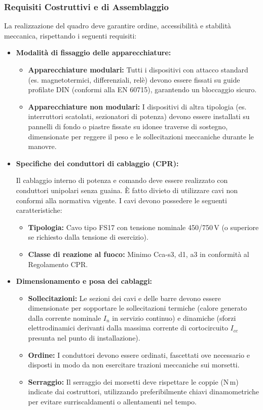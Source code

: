 \subsubsection{Requisiti Costruttivi e di Assemblaggio}
La realizzazione del quadro deve garantire ordine, accessibilità e stabilità meccanica, rispettando i seguenti requisiti:
\begin{itemize}
\item \textbf{Modalità di fissaggio delle apparecchiature:}
\begin{itemize}
\item \textbf{Apparecchiature modulari:} Tutti i dispositivi con attacco standard (es. magnetotermici, differenziali, relè) devono essere fissati su guide profilate DIN (conformi alla EN 60715), garantendo un bloccaggio sicuro.
\item \textbf{Apparecchiature non modulari:} I dispositivi di altra tipologia (es. interruttori scatolati, sezionatori di potenza) devono essere installati su pannelli di fondo o piastre fissate su idonee traverse di sostegno, dimensionate per reggere il peso e le sollecitazioni meccaniche durante le manovre.
\end{itemize}

\item \textbf{Specifiche dei conduttori di cablaggio (CPR):}

Il cablaggio interno di potenza e comando deve essere realizzato con conduttori unipolari senza guaina. È fatto divieto di utilizzare cavi non conformi alla normativa vigente. I cavi devono possedere le seguenti caratteristiche:
\begin{itemize}
\item \textbf{Tipologia:} Cavo tipo FS17 con tensione nominale 450/750\,V (o superiore se richiesto dalla tensione di esercizio).
\item \textbf{Classe di reazione al fuoco:} Minimo Cca-s3, d1, a3 in conformità al Regolamento CPR.
\end{itemize}

\item \textbf{Dimensionamento e posa dei cablaggi:}
\begin{itemize}
\item \textbf{Sollecitazioni:} Le sezioni dei cavi e delle barre devono essere dimensionate per sopportare le sollecitazioni termiche (calore generato dalla corrente nominale $I_n$ in servizio continuo) e dinamiche (sforzi elettrodinamici derivanti dalla massima corrente di cortocircuito $I_{cc}$ presunta nel punto di installazione).
\item \textbf{Ordine:} I conduttori devono essere ordinati, fascettati ove necessario e disposti in modo da non esercitare trazioni meccaniche sui morsetti.
\item \textbf{Serraggio:} Il serraggio dei morsetti deve rispettare le coppie (N\,m) indicate dai costruttori, utilizzando preferibilmente chiavi dinamometriche per evitare surriscaldamenti o allentamenti nel tempo.
\end{itemize}
\end{itemize}


